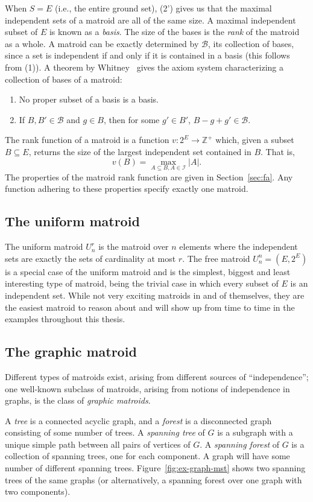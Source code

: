 When $S=E$ (i.e., the entire ground set), (2') gives us that the maximal independent sets of a matroid are all of the same size. A maximal independent subset of $E$ is known as a \textit{basis}. The size of the bases is the \textit{rank} of the matroid as a whole.  A matroid can be exactly determined by $\mathcal{B}$, its collection of bases, since a set is independent if and only if it is contained in a basis (this follows from (1)). A theorem by Whitney~\cite{whitney-1935} gives the axiom system characterizing a collection of bases of a matroid: 
\begin{enumerate}
  \item No proper subset of a basis is a basis.
  \item If $B, B'\in \mathcal{B}$ and $g \in B$, then for some $g'\in B'$, $B-g+g'\in\mathcal{B}$.
\end{enumerate} 

The rank function of a matroid is a function $v:2^E \to \mathbb{Z}^+$ which, given a subset $B\subseteq E$, returns the size of the largest independent set contained in $B$. That is, $$v(B) = \max_{A \subseteq B, A\in \mathcal{I}}|A|.$$ The properties of the matroid rank function are given in Section~\ref{sec:fa}. Any function adhering to these properties specify exactly one matroid.

\subsection{The uniform matroid}
The uniform matroid $U_n^r$ is the matroid over $n$ elements where the independent sets are exactly the sets of cardinality at most $r$. The free matroid $U_n^n = (E, 2^E)$ is a special case of the uniform matroid and is the simplest, biggest and least interesting type of matroid, being the trivial case in which every subset of $E$ is an independent set. While not very exciting matroids in and of themselves, they are the easiest matroid to reason about and will show up from time to time in the examples throughout this thesis.

\subsection{The graphic matroid}
Different types of matroids exist, arising from different sources of ``independence''; one well-known subclass of matroids, arising from notions of independence in graphs, is the class of \textit{graphic matroids}.

A \textit{tree} is a connected acyclic graph, and a \textit{forest} is a disconnected graph consisting of some number of trees. A \textit{spanning tree} of $G$ is a subgraph with a unique simple path between all pairs of vertices of $G$. A \textit{spanning forest} of $G$ is a collection of spanning trees, one for each component. A graph will have some number of different spanning trees. Figure~\ref{fig:ex-graph-mst} shows two spanning trees of the same graphs (or alternatively, a spanning forest over one graph with two components).

